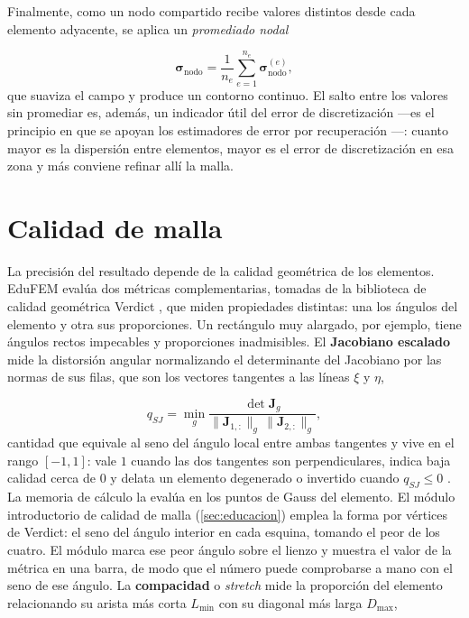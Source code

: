 Finalmente, como un nodo compartido recibe valores distintos desde cada elemento adyacente, se aplica un \emph{promediado nodal}

\begin{equation}
\bm{\sigma}_{\text{nodo}} = \frac{1}{n_e}\sum_{e=1}^{n_e} \bm{\sigma}_{\text{nodo}}^{(e)},
\label{eq:promediado}
\end{equation}
que suaviza el campo y produce un contorno continuo. El salto entre los valores sin promediar es, además, un indicador útil del error de discretización —es el principio en que se apoyan los estimadores de error por recuperación \autocite[pp.~476-477]{zienkiewicz2013fem}—: cuanto mayor es la dispersión entre elementos, mayor es el error de discretización en esa zona y más conviene refinar allí la malla.

\section{Calidad de malla}
\label{sec:calidad-malla}

La precisión del resultado depende de la calidad geométrica de los elementos. EduFEM evalúa dos métricas complementarias, tomadas de la biblioteca de calidad geométrica Verdict \autocite[p.~3]{stimpson2007verdict}, que miden propiedades distintas: una los ángulos del elemento y otra sus proporciones. Un rectángulo muy alargado, por ejemplo, tiene ángulos rectos impecables y proporciones inadmisibles. El \textbf{Jacobiano escalado} mide la distorsión angular normalizando el determinante del Jacobiano por las normas de sus filas, que son los vectores tangentes a las líneas $\xi$ y $\eta$,

\begin{equation}
q_{SJ} = \min_g \frac{\det\bm{J}_g}{\|\bm{J}_{1,:}\|_g\,\|\bm{J}_{2,:}\|_g},
\label{eq:scaled-jacobian}
\end{equation}
cantidad que equivale al seno del ángulo local entre ambas tangentes y vive en el rango $[-1, 1]$: vale $1$ cuando las dos tangentes son perpendiculares, indica baja calidad cerca de $0$ y delata un elemento degenerado o invertido cuando $q_{SJ} \le 0$ \autocite[pp.~36, 51]{stimpson2007verdict}. La memoria de cálculo la evalúa en los puntos de Gauss del elemento. El módulo introductorio de calidad de malla (\autoref{sec:educacion}) emplea la forma por vértices de Verdict: el seno del ángulo interior en cada esquina, tomando el peor de los cuatro. El módulo marca ese peor ángulo sobre el lienzo y muestra el valor de la métrica en una barra, de modo que el número puede comprobarse a mano con el seno de ese ángulo. La \textbf{compacidad} o \emph{stretch} mide la proporción del elemento relacionando su arista más corta $L_{\min}$ con su diagonal más larga $D_{\max}$,

